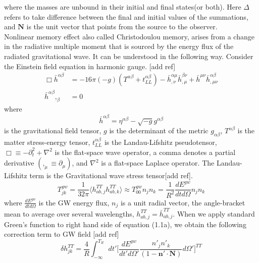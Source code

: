 \documentclass[prd,preprintnumbers,twocolumn,eqsecnum,floatfix,letter]{revtex4}
\begin{document}
where the masses are unbound in their initial and final states(or both). Here $\Delta$ refers to take difference between the final and initial values of the summations, and $\boldsymbol{N}$ is the unit vector that points from the source to the observer.  
\\
 Nonlinear memory effect also called Christodoulou memory, arises from a change in the radiative multiple moment that is sourced by the energy flux of the radiated gravitational wave. It can be understood in the following way. Consider the Einstein field equation in harmonic gauge. [add ref] 
\begin{subequations}
\begin{align}	
\Box \bar{h}^{\alpha \beta} & = -16\pi (-g)(T^{\alpha\beta} + t_{LL}^{\alpha\beta})-\bar{h}^{\alpha\mu}_{,\nu}\bar{h}^{\beta\nu}_{,\mu}+\bar{h}^{\mu\nu}\bar{h}^{\alpha\beta}_{,\mu\nu}\\
\bar{h}^{\alpha \beta},_{\beta} & = 0
\end{align}
\end{subequations}
where
\begin{equation}
\bar{h}^{\alpha \beta} = \eta^{\alpha\beta}-\sqrt{-g}g^{\alpha\beta} 
\end{equation}
is the gravitational field tensor, $g$ is the determinant of the metric $g_{\alpha\beta}$, $T^{\alpha\beta}$ is the matter stress-energy tensor, $t^{\alpha\beta}_{LL}$ is the Landau-Lifshitz pseudotensor, $\Box \equiv  -\partial^{2}_{t} + \nabla^{2}$ is the flat-space wave operator, a comma denotes a partial derivative $(,_{\mu}\equiv \partial_{\mu})$, and $\nabla^{2}$ is a flat-space Laplace operator. The Landau-Lifshitz term is the Gravitational wave stress tensor[add ref].
\begin{equation}
	T^{gw}_{jk}=\frac{1}{32\pi}\langle h^{TT}_{ab,j}h^{TT}_{ab,k}\rangle\approx T^{gw}_{00}n_{j}n_{k} = \frac{1}{R^{2}}\frac{dE^{gw}}{dt d\Omega}n_{j}n_{k}
\end{equation}
where $\frac{dE^{gw}}{dtd\Omega}$ is the GW energy flux, $n_{j}$ is a unit radial vector, the angle-bracket mean to average over several wavelengths, $h^{TT}_{ab,j}=\bar{h}^{TT}_{ab,j}$. When we apply standard Green's function to right hand side of equation (1.1a), we obtain the following correction term to GW field [add ref]
\begin{equation}
	\delta h^{TT}_{jk} = \frac{4}{R}\int_{-\infty}^{T_{R}} dt'\Bigg[ \frac{dE^{gw}}{dt'd\Omega'}\frac{n'_{j}n'_{k}}{(1-\boldsymbol{n'}\cdot\boldsymbol{N})}d\Omega'\Bigg]^{TT}
\end{equation}
\end{document}
